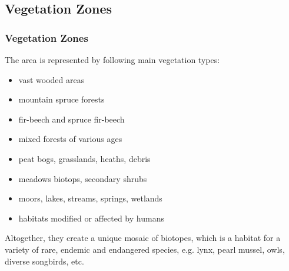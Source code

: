 \documentclass[pdflatex,compress,8pt,
	xcolor={dvipsnames,dvipsnames,svgnames,x11names,table},
	hyperref={
	breaklinks = true, 
	pdfauthor={Lemenkova Polina}, 
	pdfsubject={Preentation}, 
	pdfcreator={Lemenkova Polina}, 
	pdfproducer={Lemenkova Polina}, 
	colorlinks=true,linkcolor=blue, 
	citecolor=NavyBlue, 
	urlcolor = NavyBlue, 
	breaklinks = true}]{beamer}
\begin{document}
\subsection{Vegetation Zones}
\begin{frame}\frametitle{Vegetation Zones}
The area is represented by following main vegetation types:
\begin{itemize}
	\item vast wooded areas
	\item mountain spruce forests
	\item fir-beech and spruce fir-beech
	\item mixed forests of various ages
	\item peat bogs, grasslands, heaths, debris
	\item meadows biotops, secondary shrubs
	\item moors, lakes, streams, springs, wetlands
	\item habitats modified or affected by humans	
\end{itemize}
Altogether, they create a unique mosaic of biotopes, which is a habitat for a variety of rare, endemic and endangered species, e.g. lynx, pearl mussel, owls, diverse songbirds, etc.
\end{frame}
\end{document}

